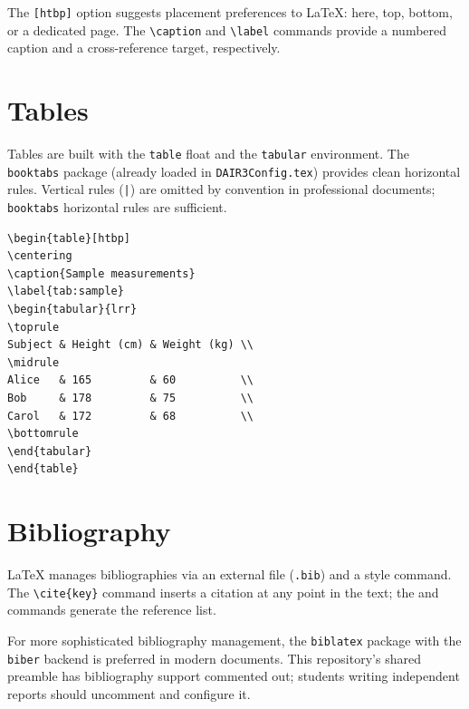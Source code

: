 The \texttt{[htbp]} option suggests placement preferences to
\LaTeX{}: here, top, bottom, or a dedicated page. The
\verb|\caption| and \verb|\label| commands provide a numbered caption
and a cross-reference target, respectively.

\section{Tables}
\label{sec:latex-tables}

Tables are built with the \texttt{table} float and the
\texttt{tabular} environment. The \texttt{booktabs} package (already
loaded in \texttt{DAIR3Config.tex}) provides clean horizontal rules.
Vertical rules (\texttt{|}) are omitted by convention in professional
documents; \texttt{booktabs} horizontal rules are sufficient.

\begin{lstlisting}[style=inlineStyle, caption={A minimal table with booktabs}]
\begin{table}[htbp]
\centering
\caption{Sample measurements}
\label{tab:sample}
\begin{tabular}{lrr}
\toprule
Subject & Height (cm) & Weight (kg) \\
\midrule
Alice   & 165         & 60          \\
Bob     & 178         & 75          \\
Carol   & 172         & 68          \\
\bottomrule
\end{tabular}
\end{table}
\end{lstlisting}

\section{Bibliography}
\label{sec:latex-bibliography}

\LaTeX{} manages bibliographies via an external file (\texttt{.bib})
and a style command. The \verb|\cite{key}| command inserts a citation
at any point in the text; the \verb|| and
\verb|| commands generate the reference list.

For more sophisticated bibliography management, the \texttt{biblatex}
package with the \texttt{biber} backend is preferred in modern
documents. This repository's shared preamble has bibliography support
commented out; students writing independent reports should uncomment
and configure it.

